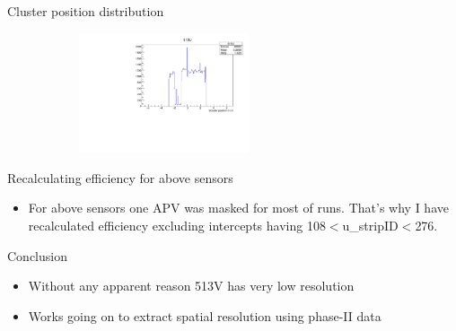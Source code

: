 \documentclass[xcolor=dvipsnames]{beamer}
\begin{document}
\begin{frame} {Cluster position distribution}
\begin{multicols}{2}
\begin{figure}[H]
\begin{center}
			\end{center}
		\end{figure}
		\begin{figure}[H]
			\begin{center}			
				\begin{subfigure}[b]{0.40\textwidth}
					\includegraphics[width=5cm]{613U.pdf}
				\end{subfigure}				
			\end{center}
		\end{figure}
	\end{multicols}        
\end{frame}
\begin{frame}{Recalculating efficiency for above sensors}
	\begin{itemize}
		\item For above sensors one APV was masked for most of runs. That's why I have recalculated efficiency excluding intercepts having 108$<$u\_stripID$<$276. 
	\end{itemize}
\end{frame}
\begin{frame}{Conclusion}
	\begin{itemize}
		\item Without any apparent reason 513V has very low resolution
		\item Works going on to extract spatial resolution using phase-II data
	\end{itemize}
\end{frame}
\end{document}
